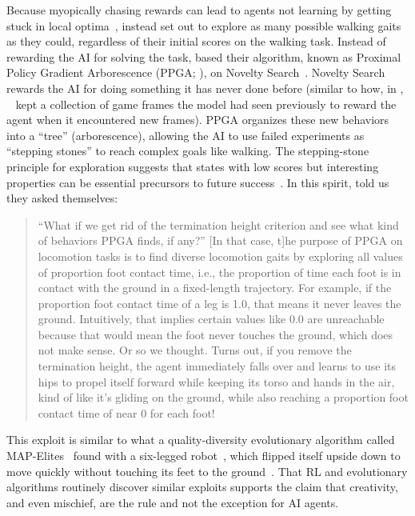 Because myopically chasing rewards can lead to agents not learning by getting stuck in local optima~\citep{lehman2011abandoning, norman2023firstexplore}, \citet{batra2024proximalpolicygradientarborescence} instead set out to explore as many possible walking gaits as they could, regardless of their initial scores on the walking task.
Instead of rewarding the AI for solving the task, \citet{batra2024proximalpolicygradientarborescence} based their algorithm, known as Proximal Policy Gradient Arborescence (PPGA; \citealp{batra2024proximalpolicygradientarborescence}), on Novelty Search~\citep{lehman2011abandoning}.
Novelty Search rewards the AI for doing something it has never done before (similar to how, in , \citeauthor{PokemonRedExperiments}~\citeyear{PokemonRedExperiments} kept a collection of game frames the model had seen previously to reward the agent when it encountered new frames).
PPGA organizes these new behaviors into a ``tree'' (arborescence), allowing the AI to use failed experiments as ``stepping stones'' to reach complex goals like walking.
The stepping-stone principle for exploration suggests that states with low scores but interesting properties can be essential precursors to future success~\citep{lehman2011abandoning, stanley2015greatness}.
In this spirit, \citet{batra2024proximalpolicygradientarborescence} told us they asked themselves:

\begin{quote}

``What if we get rid of the termination height criterion and see what kind of behaviors PPGA finds, if any?''
[In that case, t]he purpose of PPGA on locomotion tasks is to find diverse locomotion gaits by exploring all values of proportion foot contact time, i.e., the proportion of time each foot is in contact with the ground in a fixed-length trajectory.
For example, if the proportion foot contact time of a leg is 1.0, that means it never leaves the ground. Intuitively, that implies certain values like 0.0 are unreachable because that would mean the foot never touches the ground, which does not make sense.
Or so we thought.
Turns out, if you remove the termination height, the agent immediately falls over and learns to use its hips to propel itself forward while keeping its torso and hands in the air, kind of like it's gliding on the ground, while also reaching a proportion foot contact time of near 0 for each foot!
    
\end{quote}

This exploit is similar to what a quality-diversity evolutionary algorithm called MAP-Elites~\citep{mouret2015illuminating} found with a six-legged robot~\citep{cully2015robots}, which flipped itself upside down to move quickly without touching its feet to the ground~\citep{lehman2018surprising}.
That RL and evolutionary algorithms routinely discover similar exploits supports the claim that creativity, and even mischief, are the rule and not the exception for AI agents.
